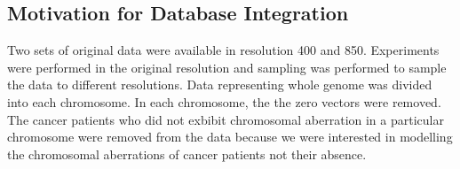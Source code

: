 

\subsection{Motivation for Database Integration}
\label{ss:motivationdatabseintrigation}

Two sets of original data were available in resolution 400 and 850. Experiments were performed in the original resolution and sampling was performed to sample the data to different resolutions. Data representing whole genome was divided into each chromosome. In each chromosome, the the zero vectors were removed. The cancer patients who did not exbibit chromosomal aberration in a particular chromosome were removed from the data because we were interested in modelling the chromosomal aberrations of cancer patients not their absence.

